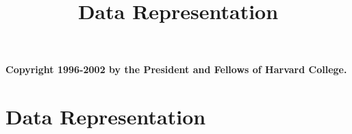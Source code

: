\documentclass[makeidx,11pt]{book}
\title{{\Huge\bf Data Representation}}
\begin{document}
\frontmatter

\maketitle

{\bf Copyright 1996-2002 by the President and Fellows of Harvard College. }

\tableofcontents

\mainmatter

\chapter{Data Representation}


\printindex
\end{document}
